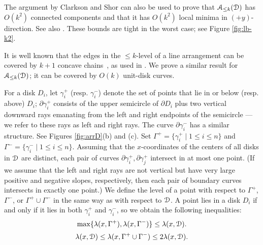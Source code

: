 \documentclass[11pt]{myclass}
\newcommand{\EuD}{\ensuremath{\EuScript{D}}}
\newcommand{\EuA}{\ensuremath{\EuScript{A}}}
\begin{document}
\begin{remark}
The argument by Clarkson and Shor can also be used to prove that $\EuA_{\leq k}(\EuD)$ has $O(k^2)$ connected components and that it has $O(k^2)$ local minima in $(+y)$-direction.  See also \cite{Cla93,Mat95}.  These bounds are tight in the worst case; see Figure \ref{fig:lb-k2}.
\end{remark}

\vspace{.1in}
It is well known that the edges in the ${\le}k$-level of a line arrangement can be covered by $k+1$ concave chains~\cite{Gus79}, as used in \cite{Dey98,Cha05}.  We prove a similar result for $\EuA_{\leq k}(\EuD)$; it can be covered by $O(k)$ unit-disk curves.  

For a disk $D_i$, let $\gamma_i^+$ (resp. $\gamma_i^-$) denote the set of points that lie in or below (resp. above) $D_i$; $\partial \gamma_i^+$ consists of the upper semicircle of $\partial D_i$ plus two vertical downward rays emanating from the left and right endpoints of the semicircle --- we refer to these rays as left and right rays.  The curve $\partial \gamma_i^-$ has a similar structure.  See Figures \ref{fig:arrD}(b) and (c).  Set $\Gamma^+ = \{\gamma_i^+ \mid 1 \leq i \leq n\}$ and $\Gamma^- = \{\gamma_i^- \mid 1 \leq i \leq n\}$.  Assuming that the $x$-coordinates of the centers of all disks in $\EuD$ are distinct, each pair of curves $\partial \gamma_i^+, \partial \gamma_j^+$ intersect in at most one point.  (If we assume that the left and right rays are not vertical but have very large positive and negative slopes, respectively, then each pair of boundary curves intersects in exactly one point.)  We define the level of a point with respect to $\Gamma^+$, $\Gamma^-$, or $\Gamma^+ \cup \Gamma^-$ in the same way as with respect to $\EuD$.  A point lies in a disk $D_i$ if and only if it lies in both $\gamma_i^+$ and $\gamma_i^-$, so we obtain the following inequalities:
\begin{equation}
\max \{\lambda(x, \Gamma^+), \lambda(x,\Gamma^-) \} \leq \lambda(x,\EuD).
\label{eq:gam-leq-D}
\end{equation}
\begin{equation}
\lambda(x,\EuD) \leq \lambda(x, \Gamma^+ \cup \Gamma^-) \leq 2 \lambda(x,\EuD).
\label{eq:cup-D}
\end{equation}
\end{document}
